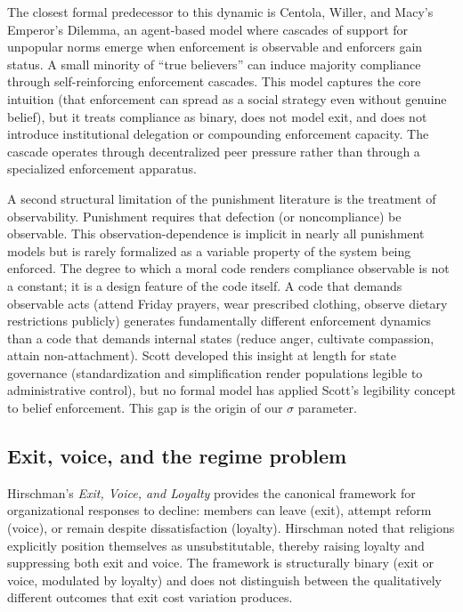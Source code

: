 \documentclass[12pt]{article}
\begin{document}
The closest formal predecessor to this dynamic is Centola, Willer, and Macy's \cite{centola2005} Emperor's Dilemma, an agent-based model where cascades of support for unpopular norms emerge when enforcement is observable and enforcers gain status. A small minority of ``true believers'' can induce majority compliance through self-reinforcing enforcement cascades. This model captures the core intuition (that enforcement can spread as a social strategy even without genuine belief), but it treats compliance as binary, does not model exit, and does not introduce institutional delegation or compounding enforcement capacity. The cascade operates through decentralized peer pressure rather than through a specialized enforcement apparatus.

A second structural limitation of the punishment literature is the treatment of observability. Punishment requires that defection (or noncompliance) be observable. This observation-dependence is implicit in nearly all punishment models but is rarely formalized as a variable property of the system being enforced. The degree to which a moral code renders compliance observable is not a constant; it is a design feature of the code itself. A code that demands observable acts (attend Friday prayers, wear prescribed clothing, observe dietary restrictions publicly) generates fundamentally different enforcement dynamics than a code that demands internal states (reduce anger, cultivate compassion, attain non-attachment). Scott \cite{scott1998} developed this insight at length for state governance (standardization and simplification render populations legible to administrative control), but no formal model has applied Scott's legibility concept to belief enforcement. This gap is the origin of our $\sigma$ parameter.

\subsection{Exit, voice, and the regime problem}

Hirschman's \cite{hirschman1970} \textit{Exit, Voice, and Loyalty} provides the canonical framework for organizational responses to decline: members can leave (exit), attempt reform (voice), or remain despite dissatisfaction (loyalty). Hirschman noted that religions explicitly position themselves as unsubstitutable, thereby raising loyalty and suppressing both exit and voice. The framework is structurally binary (exit or voice, modulated by loyalty) and does not distinguish between the qualitatively different outcomes that exit cost variation produces.
\end{document}
